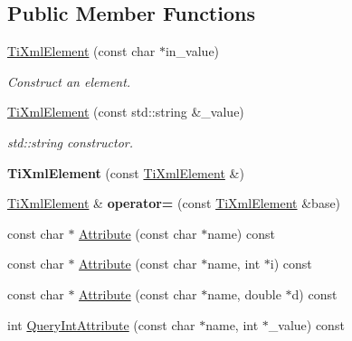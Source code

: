 \subsection*{Public Member Functions}
\begin{DoxyCompactItemize}
\item 
\mbox{\label{class_ti_xml_element_a01bc3ab372d35da08efcbbe65ad90c60}} 
\hyperlink{class_ti_xml_element_a01bc3ab372d35da08efcbbe65ad90c60}{Ti\+Xml\+Element} (const char $\ast$in\+\_\+value)
\begin{DoxyCompactList}\small\item\em Construct an element. \end{DoxyCompactList}\item 
\mbox{\label{class_ti_xml_element_a40fc2e3c1a955e2f78e1a32350d180e7}} 
\hyperlink{class_ti_xml_element_a40fc2e3c1a955e2f78e1a32350d180e7}{Ti\+Xml\+Element} (const std\+::string \&\+\_\+value)
\begin{DoxyCompactList}\small\item\em std\+::string constructor. \end{DoxyCompactList}\item 
\mbox{\label{class_ti_xml_element_a1ca4465f3c2eac6a60e641cd7f1d9f7e}} 
{\bfseries Ti\+Xml\+Element} (const \hyperlink{class_ti_xml_element}{Ti\+Xml\+Element} \&)
\item 
\mbox{\label{class_ti_xml_element_ad58d300f4cfc0016ffa6861ebb718a0b}} 
\hyperlink{class_ti_xml_element}{Ti\+Xml\+Element} \& {\bfseries operator=} (const \hyperlink{class_ti_xml_element}{Ti\+Xml\+Element} \&base)
\item 
const char $\ast$ \hyperlink{class_ti_xml_element_a6042f518748f475a7ac4b4e0b509eb05}{Attribute} (const char $\ast$name) const
\item 
const char $\ast$ \hyperlink{class_ti_xml_element_a8005d0b808fd02bd1246710cdf95e5f6}{Attribute} (const char $\ast$name, int $\ast$i) const
\item 
const char $\ast$ \hyperlink{class_ti_xml_element_a09df893402d0ab1402c8725e6d30ec04}{Attribute} (const char $\ast$name, double $\ast$d) const
\item 
int \hyperlink{class_ti_xml_element_a5c0f739e0f6f5905a201364532e54a60}{Query\+Int\+Attribute} (const char $\ast$name, int $\ast$\+\_\+value) const

\end{DoxyCompactItemize}
